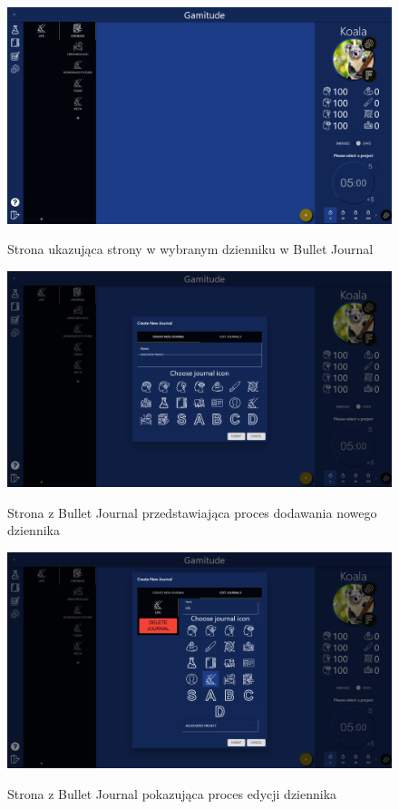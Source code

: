 \documentclass[a4paper,11pt]{report}
\begin{document}
\begin{figure}[H]
	\centering
	\includegraphics[scale=0.3]{prezentacja/Bullet_pages}\\
	\caption{Strona ukazująca strony w wybranym dzienniku w Bullet Journal}
	\label{fig:Bullet_pages}
\end{figure}
\begin{figure}[H]
	\centering
	\includegraphics[scale=0.3]{prezentacja/Bullet_Journal_add}\\
	\caption{Strona z Bullet Journal przedstawiająca proces dodawania nowego dziennika}
	\label{fig:Bullet_Journal_add}
\end{figure}
\begin{figure}[H]
	\centering
	\includegraphics[scale=0.3]{prezentacja/Journal_edit}\\
	\caption{Strona z Bullet Journal pokazująca proces edycji dziennika}
	\label{fig:Journal_edit}
\end{figure}
\end{document}
